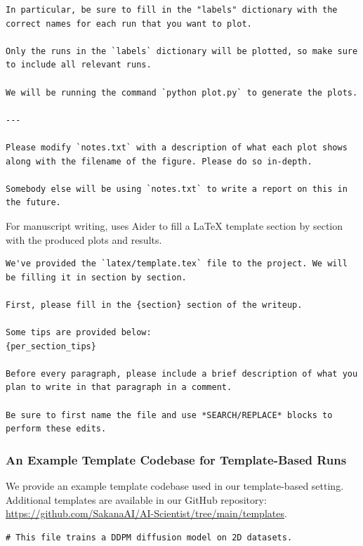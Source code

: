 \begin{appendices}
\begin{tcolorbox}[breakable, colback=orange!5!white, colframe=orange!80!black, title=Plotting Aider Prompt]
\begin{Verbatim}[breaklines, breaksymbol={}, breaksymbolleft={}, fontsize=\small]
In particular, be sure to fill in the "labels" dictionary with the correct names for each run that you want to plot.

Only the runs in the `labels` dictionary will be plotted, so make sure to include all relevant runs.

We will be running the command `python plot.py` to generate the plots.

---

Please modify `notes.txt` with a description of what each plot shows along with the filename of the figure. Please do so in-depth.

Somebody else will be using `notes.txt` to write a report on this in the future.
\end{Verbatim}
\end{tcolorbox}

For manuscript writing, \ouralgo uses Aider to fill a LaTeX template section by section with the produced plots and results.
\begin{tcolorbox}[breakable, colback=orange!5!white, colframe=orange!80!black, title=Paper Writing Aider Prompt]
\begin{Verbatim}[breaklines, breaksymbol={}, breaksymbolleft={}, fontsize=\small]
We've provided the `latex/template.tex` file to the project. We will be filling it in section by section.

First, please fill in the {section} section of the writeup.

Some tips are provided below:
{per_section_tips}

Before every paragraph, please include a brief description of what you plan to write in that paragraph in a comment.

Be sure to first name the file and use *SEARCH/REPLACE* blocks to perform these edits.
\end{Verbatim}
\end{tcolorbox}

\subsubsection{An Example Template Codebase for Template-Based Runs}
\label{app:v1_template_codebase_example}

We provide an example template codebase used in our template-based setting.
Additional templates are available in our GitHub repository:
\url{https://github.com/SakanaAI/AI-Scientist/tree/main/templates}.

\begin{tcolorbox}[breakable,colback=orange!5!white, colframe=orange!80!black, title=Generalized Idea Generation System and User Prompt]
\begin{Verbatim}[breaklines, breaksymbol={}, breaksymbolleft={}, fontsize=\small]
# This file trains a DDPM diffusion model on 2D datasets.


\end{Verbatim}
\end{tcolorbox}
\end{appendices}
